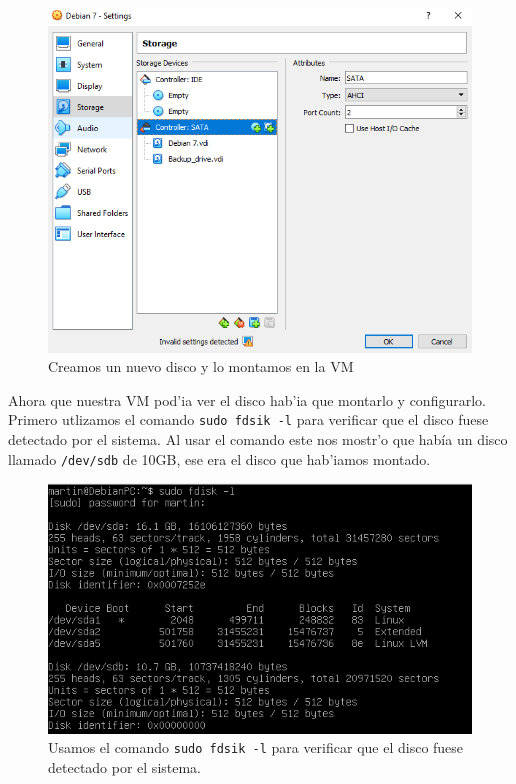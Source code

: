 \documentclass[11pt]{article}
\begin{document}
		\begin{figure}[H]
    			\centering
    			\includegraphics[scale=0.65]{Images/rsync/rsync_hdd_config.PNG}
    			\caption{Creamos un nuevo disco y lo montamos en la VM}
    			\label{fig:rsync_usb_config}
		\end{figure}

		Ahora que nuestra VM pod'ia ver el disco hab'ia que montarlo y configurarlo. Primero utlizamos el comando \texttt{sudo fdsik -l} para verificar que el disco fuese detectado por el sistema. Al usar el comando este nos mostr'o que había un disco llamado \texttt{/dev/sdb} de 10GB, ese era el disco que hab'iamos montado.

		\begin{figure}[H]
    			\centering
    			\includegraphics[scale=0.55]{Images/rsync/rsync_disk_info.PNG}
    			\caption{Usamos el comando \texttt{sudo fdsik -l} para verificar que el disco fuese detectado por el sistema.}
    			\label{fig:rsync_disk_info}
		\end{figure}
\end{document}
